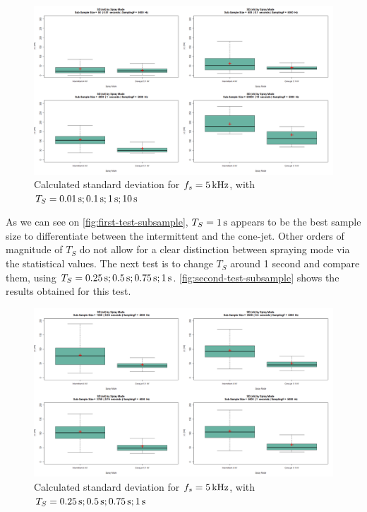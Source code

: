 \documentclass[oneside,12pt]{article}
\begin{document}
\begin{figure}[h!]
    \centering
    \includegraphics[width=\textwidth,trim=1 1 1 1,clip]{figures/first-test-subsample.png}
    \caption{Calculated standard deviation for $f_s = 5 \,\mathrm{kHz}$, with $T_S = 0.01 \,\mathrm{s}; 0.1 \,\mathrm{s}; 1 \,\mathrm{s}; 10 \,\mathrm{s}$}
    \label{fig:first-test-subsample}
\end{figure}

As we can see on \autoref{fig:first-test-subsample}, $T_S = 1 \,\mathrm{s}$ appears to be the best sample size to 
differentiate between the intermittent and the cone-jet. Other orders of magnitude of $T_S$ do not allow for a clear distinction
between spraying mode via the statistical values. The next test is to change $T_S$ around 1 second and compare them, 
using $T_S = 0.25 \,\mathrm{s}; 0.5 \,\mathrm{s}; 0.75 \,\mathrm{s}; 1 \,\mathrm{s}$. \autoref{fig:second-test-subsample} shows the results obtained  
for this test.

\begin{figure}[h!]
    \centering
    \includegraphics[width=\textwidth,trim=1 1 1 1,clip]{figures/second-test-subsample.png}
    \caption{Calculated standard deviation for $f_s = 5 \,\mathrm{kHz}$, with $T_S = 0.25 \,\mathrm{s}; 0.5 \,\mathrm{s}; 0.75 \,\mathrm{s}; 1 \,\mathrm{s}$}
    \label{fig:second-test-subsample}
\end{figure}
\end{document}
